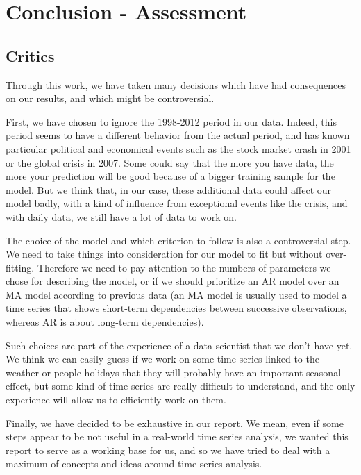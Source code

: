 \label{sec:08Conclusion}
\section{Conclusion - Assessment}
 
\subsection{Critics}
Through this work, we have taken many decisions which have had consequences on our results, and which might be controversial.

First, we have chosen to ignore the 1998-2012 period in our data. Indeed, this period seems to have a different behavior from the actual period, and has known particular political and economical events such as the stock market crash in 2001 or the global crisis in 2007. Some could say that the more you have data, the more your prediction will be good because of a bigger training sample for the model. But we think that, in our case, these additional data could affect our model badly, with a kind of influence from exceptional events like the crisis, and with daily data, we still have a lot of data to work on. 

The choice of the model and which criterion to follow is also a controversial step. We need to take things into consideration for our model to fit but without over-fitting. Therefore we need to pay attention to the numbers of parameters we chose for describing the model, or if we should prioritize an AR model over an MA model according to previous data (an MA model is usually used to model a time series that shows short-term dependencies between successive observations, whereas AR is about long-term dependencies). 

Such choices are part of the experience of a data scientist that we don't have yet. We think we can easily guess if we work on some time series linked to the weather or people holidays that they will probably have an important seasonal effect, but some kind of time series are really difficult to understand, and the only experience will allow us to efficiently work on them. 

Finally, we have decided to be exhaustive in our report. We mean, even if some steps appear to be not useful in a real-world time series analysis, we wanted this report to serve as a working base for us, and so we have tried to deal with a maximum of concepts and ideas around time series analysis.


